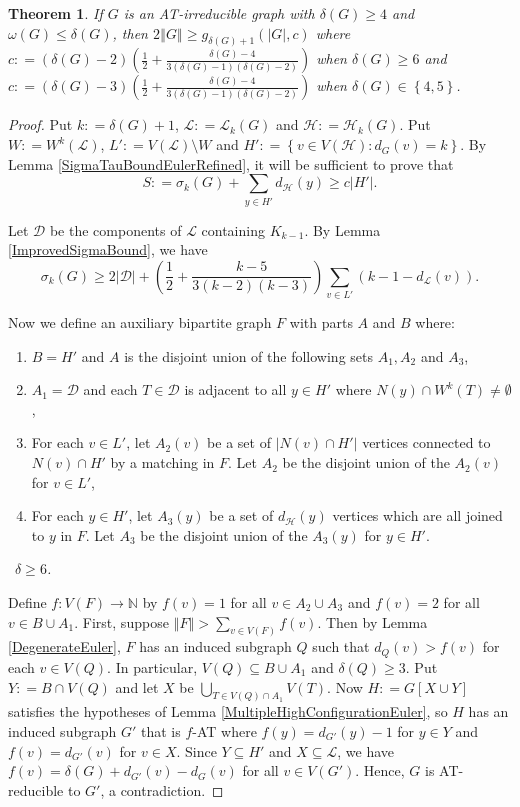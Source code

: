 \documentclass[12pt]{article}
\theoremstyle{plain}
\newtheorem{thm}{Theorem}[section]
\theoremstyle{definition}
\theoremstyle{remark}
\newcommand{\fancy}[1]{\mathcal{#1}}
\newcommand{\IN}{\mathbb{N}}
\newcommand{\D}{\fancy{D}}
\renewcommand{\L}{\fancy{L}}
\newcommand{\HH}{\fancy{H}}
\newcommand{\set}[1]{\left\{ #1 \right\}}
\newcommand{\setb}[3]{\left\{ #1 \in #2 : #3 \right\}}
\newcommand{\card}[1]{\left|#1\right|}
\newcommand{\size}[1]{\left\Vert#1\right\Vert}
\newcommand{\func}[3]{#1\colon #2 \rightarrow #3}
\newcommand{\parens}[1]{\left( #1 \right)}
\newcommand{\DefinedAs}{\mathrel{\mathop:}=}
\def\D{\fancy{D}}
\newcommand{\case}[2]{{\bf Case #1.}~{\it #2}~~}
\begin{document}
\begin{thm}\label{EdgeBoundEuler}
	If $G$ is an AT-irreducible graph with $\delta(G) \ge 4$ and $\omega(G) \le \delta(G)$, then $2\size{G} \ge g_{\delta(G)+1}(\card{G}, c)$ where $c \DefinedAs (\delta(G)-2)\parens{\frac12 + \frac{\delta(G)-4}{3(\delta(G)-1)(\delta(G)-2)}}$ when $\delta(G) \ge 6$ and $c \DefinedAs (\delta(G)-3)\parens{\frac12 + \frac{\delta(G)-4}{3(\delta(G)-1)(\delta(G)-2)}}$ when $\delta(G) \in \set{4,5}$.
\end{thm}
\begin{proof}
Put $k \DefinedAs \delta(G) + 1$, $\L \DefinedAs \L_k(G)$ and $\HH \DefinedAs \HH_k(G)$.  Put $W \DefinedAs W^k(\L)$, $L' \DefinedAs V(\L) \setminus W$ and $H' \DefinedAs \setb{v}{V(\HH)}{d_G(v) = k}$.   By Lemma \ref{SigmaTauBoundEulerRefined}, it will be sufficient to prove that \[S \DefinedAs \sigma_k(G) + \sum_{y \in H'} d_{\HH}(y) \ge c\card{H'}.\]

Let $\D$ be the components of $\L$ containing $K_{k-1}$. By Lemma \ref{ImprovedSigmaBound}, we have
\[\sigma_k(G) \ge 2|\D| + \parens{\frac12 + \frac{k-5}{3(k-2)(k-3)}}\sum_{v \in L'} (k-1-d_{\L}(v)).\]

Now we define an auxiliary bipartite graph $F$ with parts $A$ and $B$ where:
\begin{enumerate}
\item  $B = H'$ and $A$ is the disjoint union of the following sets
$A_1, A_2$ and $A_3$,
\item $A_1 = \D$ and each $T \in \D$ is adjacent to all $y \in H'$
where $N(y) \cap W^k(T) \ne \emptyset$,
\item For each $v \in L'$, let $A_2(v)$ be a set of $\card{N(v) \cap
H'}$ vertices connected to $N(v) \cap H'$ by a matching in $F$.  Let
$A_2$ be the disjoint union of the $A_2(v)$ for $v \in L'$,
\item For each $y \in H'$, let $A_3(y)$ be a set of $d_{\HH}(y)$ vertices
which are all joined to $y$ in $F$.  Let $A_3$ be the disjoint union
of the $A_3(y)$ for $y \in H'$.
\end{enumerate}

\noindent \case{1}{$\delta \ge 6$.}
\smallskip

Define $\func{f}{V(F)}{\IN}$ by $f(v) = 1$ for all $v \in A_2 \cup A_3$ and $f(v) = 2$ for all $v \in B \cup A_1$.  First, suppose $\size{F} > \sum_{v \in V(F)} f(v)$.  Then by Lemma \ref{DegenerateEuler}, $F$ has an induced subgraph $Q$ such that $d_Q(v) > f(v)$ for each $v \in V(Q)$.  In particular, $V(Q) \subseteq B \cup A_1$ and $\delta(Q) \ge 3$.  Put $Y \DefinedAs B \cap V(Q)$ and let $X$ be $\bigcup_{T \in V(Q) \cap A_1} V(T)$. Now $H \DefinedAs G[X \cup Y]$ satisfies the hypotheses of Lemma \ref{MultipleHighConfigurationEuler}, so $H$ has an induced subgraph $G'$ that is $f$-AT where $f(y) = d_{G'}(y) - 1$ for $y \in Y$ and $f(v) = d_{G'}(v)$ for $v \in X$.  Since $Y \subseteq H'$ and $X \subseteq \L$, we have $f(v) = \delta(G) + d_{G'}(v) - d_G(v)$ for all $v \in V(G')$.  Hence, $G$ is AT-reducible to $G'$, a contradiction.


\end{proof}
\end{document}
